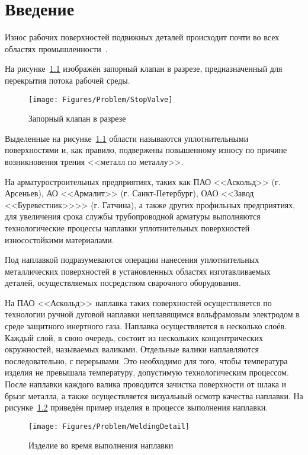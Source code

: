 \chapter{Введение}
Износ рабочих поверхностей подвижных деталей происходит почти во всех областях промышленности~\cite{Oo_2018}.

На рисунке~\ref{fig:Problem:StopValve} изображён запорный клапан в разрезе, предназначенный для перекрытия потока рабочей среды.

\begin{figure}[H]
    \centering
    \vspace{14pt}
    \texttt{[image: Figures/Problem/StopValve]}
    \caption{Запорный клапан в разрезе}
    \label{fig:Problem:StopValve}
\end{figure}

Выделенные на рисунке~\ref{fig:Problem:StopValve} области называются уплотнительными поверхностями и, как правило, подвержены повышенному износу по причине возникновения трения <<металл по металлу>>.

На арматуростроительных предприятиях, таких как ПАО <<Аскольд>> (г. Арсеньев), АО <<Армалит>> (г. Санкт-Петербург), ОАО <<Завод <<Буревестник>>>> (г. Гатчина), а также других профильных предприятиях, для увеличения срока службы трубопроводной арматуры выполняются технологические процессы наплавки уплотнительных поверхностей износостойкими материалами.

Под наплавкой подразумеваются операции нанесения уплотнительных металлических поверхностей в установленных областях изготавливаемых деталей, осуществляемых посредством сварочного оборудования.

На ПАО <<Аскольд>> наплавка таких поверхностей осуществляется по технологии ручной дуговой наплавки неплавящимся вольфрамовым электродом в среде защитного инертного газа.
Наплавка осуществляется в несколько слоёв.
Каждый слой, в свою очередь, состоит из нескольких концентрических окружностей, называемых валиками.
Отдельные валики наплавляются последовательно, с перерывами.
Это необходимо для того, чтобы температура изделия не превышала температуру, допустимую технологическим процессом.
После наплавки каждого валика проводится зачистка поверхности от шлака и брызг металла, а также осуществляется визуальный осмотр качества наплавки.
На рисунке~\ref{fig:Problem:WeldingDetail} приведён пример изделия в процессе выполнения наплавки.

\begin{figure}[H]
    \centering
    \vspace{14pt}
    \texttt{[image: Figures/Problem/WeldingDetail]}
    \caption{Изделие во время выполнения наплавки}
    \label{fig:Problem:WeldingDetail}
\end{figure}

